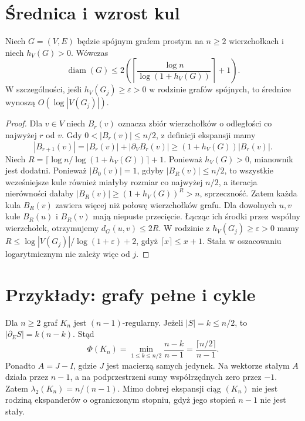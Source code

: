 \section{Średnica i wzrost kul}
\label{sec:tg-expanders-diameter}

\begin{twierdzenie}
\label{thm:tg-expander-diameter}
Niech $G=(V,E)$ będzie spójnym grafem
prostym na $n\geq2$ wierzchołkach
i niech $h_V(G)>0$.
Wówczas
\[
\operatorname{diam}(G)\leq
2\left(
\left\lceil
\frac{\log n}{\log(1+h_V(G))}
\right\rceil+1\right).
\]
W szczególności, jeśli
$h_V(G_j)\geq\varepsilon>0$
w rodzinie grafów spójnych,
to średnice wynoszą $O(\log|V(G_j)|)$.
\end{twierdzenie}
\begin{proof}
Dla $v\in V$ niech $B_r(v)$
oznacza zbiór wierzchołków
o odległości co najwyżej $r$
od $v$. Gdy
$0<|B_r(v)|\leq n/2$,
z definicji ekspansji
mamy
\[
|B_{r+1}(v)|
=|B_r(v)|+|\partial_VB_r(v)|
\geq(1+h_V(G))|B_r(v)|.
\]
Niech
$R=\lceil\log n/\log(1+h_V(G))\rceil+1$.
Ponieważ $h_V(G)>0$, mianownik jest dodatni.
Ponieważ $|B_0(v)|=1$, gdyby $|B_R(v)|\leq n/2$,
to wszystkie wcześniejsze kule
również miałyby rozmiar
co najwyżej $n/2$,
a iteracja nierówności dałaby
$|B_R(v)|\geq(1+h_V(G))^R>n$,
sprzeczność.
Zatem każda kula $B_R(v)$
zawiera więcej niż połowę
wierzchołków grafu.
Dla dowolnych $u,v$ kule
$B_R(u)$ i $B_R(v)$ mają
niepuste przecięcie.
Łącząc ich środki przez
wspólny wierzchołek,
otrzymujemy
$d_G(u,v)\leq2R$.
W rodzinie z $h_V(G_j)\geq\varepsilon>0$
mamy $R\leq\log|V(G_j)|/\log(1+\varepsilon)+2$,
gdyż $\lceil x\rceil\leq x+1$.
Stała w oszacowaniu logarytmicznym nie zależy
więc od $j$.
\end{proof}

\section{Przykłady: grafy pełne i cykle}
\label{sec:tg-expanders-examples}

\begin{przyklad}
\label{ex:tg-expander-complete}
Dla $n\geq2$ graf $K_n$
jest $(n-1)$-regularny.
Jeżeli $|S|=k\leq n/2$,
to $|\partial_ES|=k(n-k)$.
Stąd
\[
\Phi(K_n)=
\min_{1\leq k\leq n/2}
\frac{n-k}{n-1}
=\frac{\lceil n/2\rceil}{n-1}.
\]
Ponadto $A=J-I$,
gdzie $J$ jest macierzą
samych jedynek.
Na wektorze stałym
$A$ działa przez $n-1$,
a na podprzestrzeni
sumy współrzędnych zero
przez $-1$.
Zatem
$\lambda_2(K_n)=n/(n-1)$.
Mimo dobrej ekspansji
ciąg $(K_n)$ nie jest
rodziną ekspanderów
o ograniczonym stopniu,
gdyż jego stopień
$n-1$ nie jest stały.
\end{przyklad}

